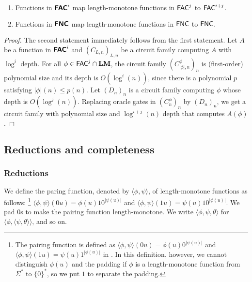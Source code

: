 \documentclass[envcountsame,orivec,oribibl]{llncs}
\begin{document}
\begin{corollary}
\mbox{}
\begin{enumerate}
 \item Functions in $\text{\bfseries \sffamily \upshape FAC}^i$ 
       map length-monotone functions in $\mathsf{FAC}^j$ 
       to $\mathsf{FAC}^{i+j}$.
 \item Functions in $\text{\bfseries \sffamily \upshape FNC}$
       map length-monotone functions in $\mathsf{FNC}$ 
       to $\mathsf{FNC}$.
\end{enumerate}
\end{corollary}

\begin{proof}
The second statement immediately follows from the first statement.
Let $A$ be a function in $\text{\bfseries \sffamily \upshape FAC}^i$ and $(C_{L,n})_{L,n}$ be a circuit
family computing $A$ with $\log^i$ depth.
For all $\phi \in \mathsf{FAC}^j \cap \mathbf{LM}$, 
the circuit family $(C^\phi_{|\phi|,n})_n$ is (first-order) polynomial size and its depth is $O(\log^i(n))$,
since there is a polynomial $p$ satisfying $|\phi|(n) \le p(n)$.
Let $(D_n)_n$ is a circuit family computing $\phi$ whose depth is $O(\log^j(n))$.
Replacing oracle gates in $(C^\phi_n)_n$ by $(D_n)_n$, 
we get a circuit family with polynomial size and $\log^{i+j}(n)$ depth
that computes $A(\phi)$.
\end{proof}




\subsection{Reductions and completeness}

\subsubsection{Reductions}
We define the paring function, denoted by $\langle \phi, \psi \rangle$,
of length-monotone functions as follows:%
\footnote{
The pairing function is defined as
$\langle \phi, \psi \rangle(0u) = \phi(u) 0^{|\psi(u)|}$
and 
$\langle \phi, \psi \rangle(1u) = \psi(u) 1^{|\phi(u)|}$ 
in \cite{kawamura2012complexity}.
In this definition, however, we cannot distinguish $\phi(u)$ and the padding
if $\phi$ is a length-monotone function from $\Sigma^*$ to $\{0\}^*$,
so we put $1$ to separate the padding.
}
$\langle \phi, \psi \rangle(0u) = \phi(u) 10^{|\psi(u)|}$ and 
$\langle \phi, \psi \rangle(1u) = \psi(u) 10^{|\phi(u)|}$.
We pad $0$s to make the pairing function length-monotone.
We write $\langle \phi, \psi, \theta \rangle$ 
for $\langle \phi, \langle \psi, \theta \rangle \rangle$, and so on.
\end{document}

